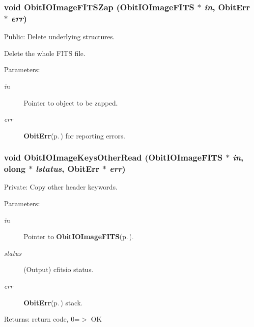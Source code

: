 \subsubsection{\setlength{\rightskip}{0pt plus 5cm}void Obit\-IOImage\-FITSZap ({\bf Obit\-IOImage\-FITS} $\ast$ {\em in}, {\bf Obit\-Err} $\ast$ {\em err})}\label{ObitIOImageFITS_8c_a23}


Public: Delete underlying structures. 

Delete the whole FITS file. \begin{Desc}
\item[Parameters:]
\begin{description}
\item[{\em in}]Pointer to object to be zapped. \item[{\em err}]{\bf Obit\-Err}{\rm (p.\,\pageref{structObitErr})} for reporting errors. \end{description}
\end{Desc}
\subsubsection{\setlength{\rightskip}{0pt plus 5cm}void Obit\-IOImage\-Keys\-Other\-Read ({\bf Obit\-IOImage\-FITS} $\ast$ {\em in}, {\bf olong} $\ast$ {\em lstatus}, {\bf Obit\-Err} $\ast$ {\em err})}\label{ObitIOImageFITS_8c_a7}


Private: Copy other header keywords. 

\begin{Desc}
\item[Parameters:]
\begin{description}
\item[{\em in}]Pointer to {\bf Obit\-IOImage\-FITS}{\rm (p.\,\pageref{structObitIOImageFITS})}. \item[{\em status}](Output) cfitsio status. \item[{\em err}]{\bf Obit\-Err}{\rm (p.\,\pageref{structObitErr})} stack. \end{description}
\end{Desc}
\begin{Desc}
\item[Returns:]return code, 0=$>$ OK \end{Desc}
